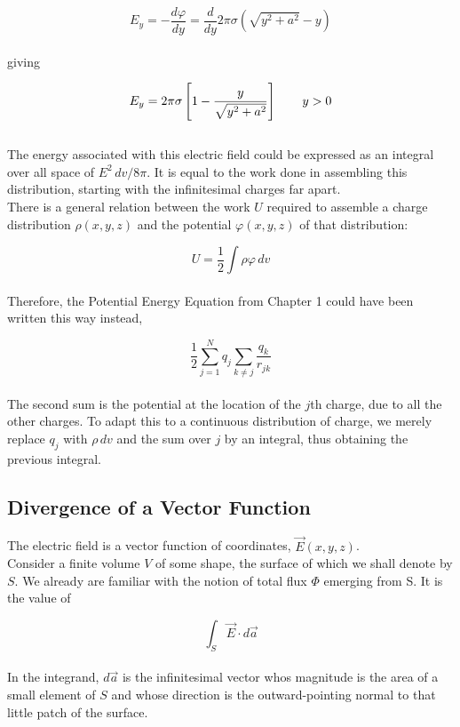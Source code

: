 \documentclass[svgnames]{article}
\begin{document}
\[ E_y = -\frac{d\varphi}{dy} = \frac{d}{dy} 2\pi \sigma (\sqrt{y^2 + a^2} - y) \] \\

giving 

\[ E_y = 2\pi \sigma \left[1 - \frac{y}{\sqrt{y^2+a^2}} \right] \hspace{20px} y > 0 \]\\

The energy associated with this electric field could be expressed as an
integral over all space of $E^2 \, dv / 8\pi$. It is equal to the work done in
assembling this distribution, starting with the infinitesimal charges far
apart. \\

There is a general relation between the work $U$ required to assemble a charge
distribution $\rho (x, y, z)$ and the potential $\varphi(x, y, z)$ of that
distribution:

\[ U = \frac{1}{2} \int \rho \varphi \, dv \] \\ 

Therefore, the Potential Energy Equation from Chapter 1 could have been written this way instead, 

\[ \frac{1}{2} \sum_{j=1}^N q_j \sum_{k\neq j} \frac{q_k}{r_{jk}} \] \\

The second sum is the potential at the location of the $j$th charge, due to all
the other charges. To adapt this to a continuous distribution of charge, we
merely replace $q_j$ with $\rho \, dv$ and the sum over $j$ by an integral,
thus obtaining the previous integral. \\

\subsection{Divergence of a Vector Function} 

The electric field is a vector function of coordinates, $\vec{E}(x, y, z)$. \\ 

Consider a finite volume $V$ of some shape, the surface of which we shall
denote by $S$. We already are familiar with the notion of total flux $\Phi$ emerging from S. It is the value of 

\[ \int_S \vec{E} \cdot d\vec{a} \] \\

In the integrand, $d\vec{a}$ is the infinitesimal vector whos magnitude is the
area of a small element of $S$ and whose direction is the outward-pointing
normal to that little patch of the surface. \\
\end{document}
